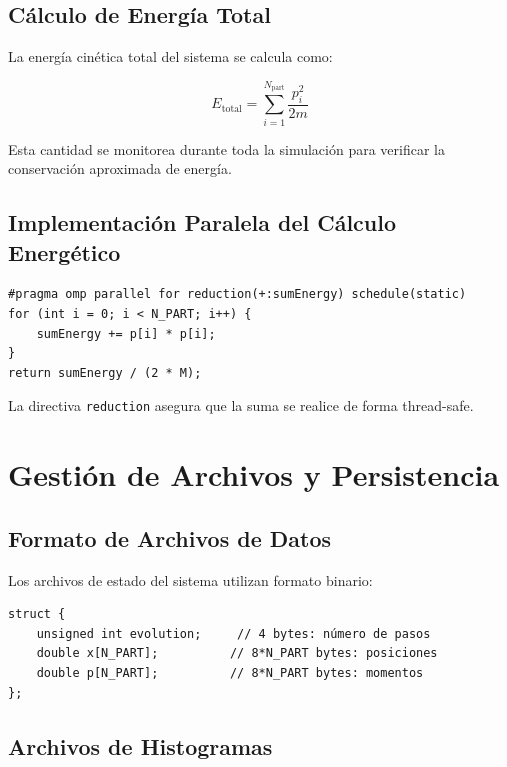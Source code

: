 \documentclass[12pt,a4paper]{article}
\begin{document}
\subsection{Cálculo de Energía Total}

La energía cinética total del sistema se calcula como:

\begin{equation}
E_{\text{total}} = \sum_{i=1}^{N_{\text{part}}} \frac{p_i^2}{2m}
\end{equation}

Esta cantidad se monitorea durante toda la simulación para verificar la conservación aproximada de energía.

\subsection{Implementación Paralela del Cálculo Energético}

\begin{lstlisting}[caption=Cálculo paralelo de energía]
#pragma omp parallel for reduction(+:sumEnergy) schedule(static)
for (int i = 0; i < N_PART; i++) {
    sumEnergy += p[i] * p[i];
}
return sumEnergy / (2 * M);
\end{lstlisting}

La directiva \texttt{reduction} asegura que la suma se realice de forma thread-safe.

\section{Gestión de Archivos y Persistencia}

\subsection{Formato de Archivos de Datos}

Los archivos de estado del sistema utilizan formato binario:

\begin{lstlisting}[caption=Estructura de archivos binarios]
struct {
    unsigned int evolution;     // 4 bytes: número de pasos
    double x[N_PART];          // 8*N_PART bytes: posiciones
    double p[N_PART];          // 8*N_PART bytes: momentos
};
\end{lstlisting}

\subsection{Archivos de Histogramas}
\end{document}
